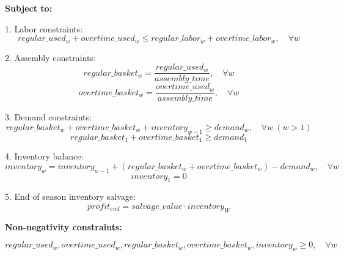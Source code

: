 \documentclass{article}
\begin{document}
\textbf{Subject to:}

1. Labor constraints:
\[
regular\_used_{w} + overtime\_used_{w} \leq regular\_labor_{w} + overtime\_labor_{w}, \quad \forall w
\]

2. Assembly constraints:
\[
regular\_basket_{w} = \frac{regular\_used_{w}}{assembly\_time}, \quad \forall w
\]
\[
overtime\_basket_{w} = \frac{overtime\_used_{w}}{assembly\_time}, \quad \forall w
\]

3. Demand constraints:
\[
regular\_basket_{w} + overtime\_basket_{w} + inventory_{w-1} \geq demand_{w}, \quad \forall w\ (w > 1)
\]
\[
regular\_basket_{1} + overtime\_basket_{1} \geq demand_{1}
\]

4. Inventory balance:
\[
inventory_{w} = inventory_{w-1} + (regular\_basket_{w} + overtime\_basket_{w}) - demand_{w}, \quad \forall w
\]
\[
inventory_{1} = 0
\]

5. End of season inventory salvage:
\[
profit_{end} = salvage\_value \cdot inventory_{W}
\]

\textbf{Non-negativity constraints:}

\[
regular\_used_{w}, overtime\_used_{w}, regular\_basket_{w}, overtime\_basket_{w}, inventory_{w} \geq 0, \quad \forall w
\]
\end{document}
